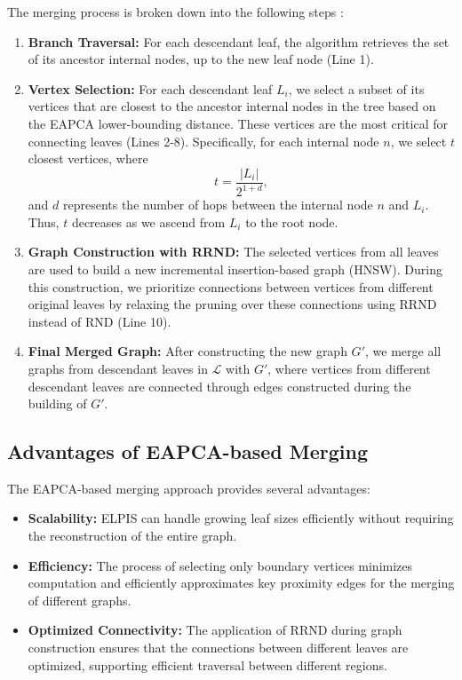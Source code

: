The merging process is broken down into the following steps :


\begin{enumerate}
    \item \textbf{Branch Traversal:} For each descendant leaf, the algorithm retrieves the set of its ancestor internal nodes, up to the new leaf node (Line 1).
    \item \textbf{Vertex Selection:} For each descendant leaf $L_i$, we select a subset of its vertices that are closest to the ancestor internal nodes in the tree based on the EAPCA lower-bounding distance. 
    These vertices are the most critical for connecting leaves (Lines 2-8).
    Specifically, for each internal node $n$, we select $t$ closest vertices, where
\[
t = \frac{|L_i|}{2^{1 + d}},
\]
and $d$ represents the number of hops between the internal node $n$ and $L_i$. Thus, $t$ decreases as we ascend from $L_i$ to the root node. 

    \item \textbf{Graph Construction with RRND:} The selected vertices from all leaves are used to build a new incremental insertion-based graph (HNSW). During this construction, we prioritize connections between vertices from different original leaves by relaxing the pruning over these connections using RRND instead of RND (Line 10).
    \item \textbf{Final Merged Graph:} After constructing the new graph $G'$, we merge all graphs from descendant leaves in $\mathcal{L}$ with $G'$, where vertices from different descendant leaves are connected through edges constructed during the building of $G'$.
\end{enumerate}

\subsection{Advantages of EAPCA-based Merging}

The EAPCA-based merging approach provides several advantages:
\begin{itemize}
    \item \textbf{Scalability:} ELPIS can handle growing leaf sizes efficiently without requiring the reconstruction of the entire graph.
    \item \textbf{Efficiency:} The process of selecting only boundary vertices minimizes computation and efficiently approximates key proximity edges for the merging of different graphs.
    \item \textbf{Optimized Connectivity:} The application of RRND during graph construction ensures that the connections between different leaves are optimized, supporting efficient traversal between different regions.
\end{itemize}


